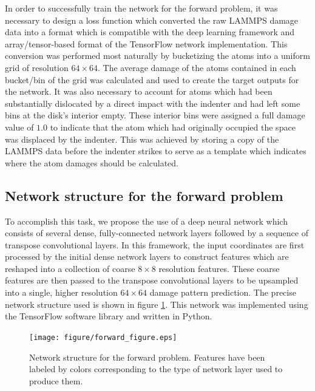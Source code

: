 In order to successfully train the network for the forward problem, it was necessary to design a loss function which converted the raw LAMMPS damage data into a format which is compatible with the deep learning framework and array/tensor-based format of the TensorFlow network implementation.  This conversion was performed most naturally by bucketizing the atoms into a uniform grid of resolution $64 \times 64$.  The average damage of the atoms contained in each bucket/bin of the grid was calculated and used to create the target outputs for the network.  It was also necessary to account for atoms which had been substantially dislocated by a direct impact with the indenter and had left some bins at the disk's interior empty.  These interior bins were assigned a full damage value of $1.0$ to indicate that the atom which had originally occupied the space was displaced by the indenter.  This was achieved by storing a copy of the LAMMPS data before the indenter strikes to serve as a template which indicates where the atom damages should be calculated.


\subsection{Network structure for the forward problem}
\label{forward_network}

To accomplish this task, we propose the use of a deep neural network which consists of several dense, fully-connected network layers followed by a sequence of transpose convolutional layers.  In this framework, the input coordinates are first processed by the initial dense network layers to construct features which are reshaped into a collection of coarse $8 \times 8$ resolution features.  These coarse features are then passed to the transpose convolutional layers to be upsampled into a single, higher resolution $64 \times 64$ damage pattern prediction.  The precise network structure used is shown in figure \ref{fig:forward}.  This network was implemented using the TensorFlow software library and written in Python.

\begin{figure}
  \centering
  \texttt{[image: figure/forward\_figure.eps]}
\caption{Network structure for the forward problem.  Features have been labeled by colors corresponding to the type of network layer used to produce them.}
\label{fig:forward}       
\end{figure}

